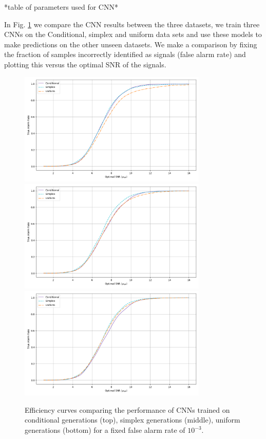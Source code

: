 \documentclass[12pt]{iopart}
\begin{document}
*table of parameters used for CNN*

In Fig. \ref{fig:roc_curves} we compare the CNN results between the three datasets, we train three CNNs on the Conditional, simplex and uniform data sets and use these models to make predictions on the other unseen datasets. We make a comparison by fixing the fraction of samples incorrectly identified as signals (false alarm rate) and plotting this versus the optimal SNR of the signals. 

\begin{figure}
    \centering
    \includegraphics[width=0.8\textwidth]{figures/conditional_trained.png}
    \includegraphics[width=0.8\textwidth]{figures/simplex_trained.png}
    \includegraphics[width=0.8\textwidth]{figures/uniform_trained.png}

    \caption{Efficiency curves comparing the performance of CNNs trained on conditional generations (top), simplex generations (middle), uniform generations (bottom) for a fixed false alarm rate of $10^{-3}$.}
    \label{fig:roc_curves}
\end{figure}
\end{document}
